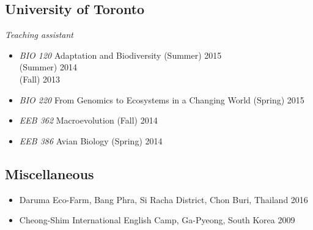 \documentclass[11pt,letterpaper,sans]{moderncv} %
\begin{document}
\subsection{University of Toronto}
	\textit{Teaching assistant}
\begin{itemize} 
	\item \textit{BIO 120} Adaptation and Biodiversity \hfill (Summer) 2015\\
				\indent\hfill (Summer) 2014\\
				\indent\hfill (Fall) 2013
	\item \textit{BIO 220} From Genomics to Ecosystems in a Changing World \hfill (Spring) 2015
	\item \textit{EEB 362} Macroevolution \hfill (Fall) 2014
	\item \textit{EEB 386} Avian Biology \hfill (Spring) 2014
\end{itemize} 

\subsection{Miscellaneous}
\begin{itemize} 
	\item Daruma Eco-Farm, Bang Phra, Si Racha District, Chon Buri, Thailand \hfill 2016
	\item Cheong-Shim International English Camp, Ga-Pyeong, South Korea \hfill 2009
\end{itemize}
\end{document}
